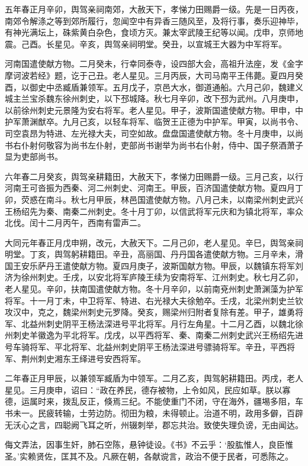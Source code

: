 \documentclass[12pt,UTF8]{ctexbook}
\begin{document}
五年春正月辛卯，舆驾亲祠南郊，大赦天下，孝悌力田赐爵一级。先是一日丙夜，南郊令解涤之等到郊所履行，忽闻空中有异香三随风至，及将行事，奏乐迎神毕，有神光满坛上，硃紫黄白杂色，食顷方灭。兼太宰武陵王纪等以闻。戊申，京师地震。己酉。长星见。辛亥，舆驾亲祠明堂。癸丑，以宣城王大器为中军将军。

河南国遣使献方物。二月癸未，行幸同泰寺，设四部大会，高祖升法座，发《金字摩诃波若经》题，讫于己丑。老人星见。三月丙辰，大司马南平王伟薨。夏四月癸酉，以御史中丞臧盾兼领军。五月戊子，京邑大水，御道通船。六月己卯，魏建义城主兰宝杀魏东徐州刺史，以下邳城降。秋七月辛卯，改下邳为武州。八月庚申，以前徐州刺史元景隆为安右将军。老人星见。甲子，波斯国遣使献方物。甲申，中护军萧渊猷卒。九月己亥，以轻车将军、临贺王正德为中护军。甲寅，以尚书令、司空袁昂为特进、左光禄大夫，司空如故。盘盘国遣使献方物。冬十月庚申，以尚书右仆射何敬容为尚书左仆射，吏部尚书谢举为尚书右仆射，侍中、国子祭酒萧子显为吏部尚书。

六年春二月癸亥，舆驾亲耕籍田，大赦天下，孝悌力田赐爵一级。三月己亥，以行河南王可沓振为西秦、河二州刺史、河南王。甲辰，百济国遣使献方物。夏四月丁卯，荧惑在南斗。秋七月甲辰，林邑国遣使献方物。八月己未，以南梁州刺史武兴王杨绍先为秦、南秦二州刺史。冬十月丁卯，以信武将军元庆和为镇北将军，率众北伐。闰十二月丙午，西南有雷声二。

大同元年春正月戊申朔，改元，大赦天下。二月己卯，老人星见。辛巳，舆驾亲祠明堂。丁亥，舆驾躬耕籍田。辛丑，高丽国、丹丹国各遣使献方物。三月辛未，滑国王安乐萨丹王遣使献方物。夏四月庚子，波斯国献方物。甲辰，以魏镇东将军刘济为徐州刺史。壬戌，以安北将军庐陵王续为安南将军、江州刺史。秋七月乙卯，老人星见。辛卯，扶南国遣使献方物。冬十月辛卯，以前南兗州刺史萧渊藻为护军将军。十一月丁未，中卫将军、特进、右光禄大夫徐勉卒。壬戌，北梁州刺史兰钦攻汉中，克之，魏梁州刺史元罗降。癸亥，赐梁州归附者复除有差。甲子，雄勇将军、北益州刺史阴平王杨法深进号平北将军。月行左角星。十二月乙酉，以魏北徐州刺史羊徽逸为平北将军。戊戌，以平西将军、秦、南秦二州刺史武兴王杨绍先进号车骑将军、平北将军、北益州刺史阴平王杨法深进号骠骑将军。辛丑，平西将军、荆州刺史湘东王绎进号安西将军。

二年春正月甲辰，以兼领军臧盾为中领军。二月乙亥，舆驾躬耕籍田。丙戌，老人星见。三月庚申，诏曰：“政在养民，德存被物，上令如风，民应如草。朕以寡德，运属时来，拨乱反正，倏焉三纪。不能使重门不闭，守在海外，疆埸多阻，车书未一。民疲转输，士劳边防。彻田为粮，未得顿止。治道不明，政用多僻，百辟无沃心之言，四聪阙飞耳之听，州辍刺举，郡忘共治。致使失理负谤，无由闻达。

侮文弄法，因事生奸，肺石空陈，悬钟徒设。《书》不云乎：‘股肱惟人，良臣惟圣。’实赖贤佐，匡其不及。凡厥在朝，各献谠言，政治不便于民者，可悉陈之。
\end{document}
